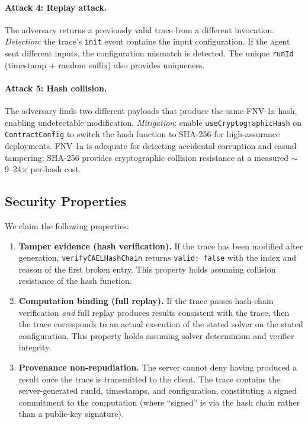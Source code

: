 \documentclass[letterpaper,twocolumn,10pt]{article}
\begin{document}
\paragraph{Attack 4: Replay attack.} The adversary returns a previously
valid trace from a different invocation. \emph{Detection}: the trace's
\texttt{init} event contains the input configuration. If the agent sent
different inputs, the configuration mismatch is detected. The unique
\texttt{runId} (timestamp + random suffix) also provides uniqueness.

\paragraph{Attack 5: Hash collision.} The adversary finds two different
payloads that produce the same FNV-1a hash, enabling undetectable
modification. \emph{Mitigation}: enable
\texttt{useCryptographicHash} on \texttt{ContractConfig} to switch the
hash function to SHA-256 for high-assurance deployments. FNV-1a is
adequate for detecting accidental corruption and casual tampering;
SHA-256 provides cryptographic collision resistance at a measured
$\sim$9--24$\times$ per-hash cost.

\subsection{Security Properties}

We claim the following properties:

\begin{enumerate}[nosep,leftmargin=*]
\item \textbf{Tamper evidence (hash verification).} If the trace has been
  modified after generation, \texttt{verifyCAELHashChain} returns
  \texttt{valid: false} with the index and reason of the first broken entry.
  This property holds assuming collision resistance of the hash function.

\item \textbf{Computation binding (full replay).} If the trace passes
  hash-chain verification \emph{and} full replay produces results consistent
  with the trace, then the trace corresponds to an actual execution of the
  stated solver on the stated configuration. This property holds assuming
  solver determinism and verifier integrity.

\item \textbf{Provenance non-repudiation.} The server cannot deny having
  produced a result once the trace is transmitted to the client. The trace
  contains the server-generated runId, timestamps, and configuration,
  constituting a signed commitment to the computation (where ``signed'' is
  via the hash chain rather than a public-key signature).
\end{enumerate}
\end{document}
